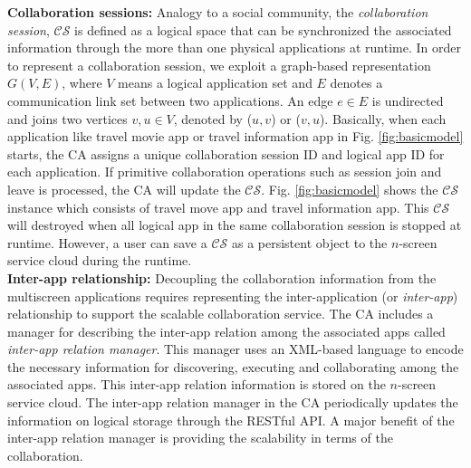 \documentclass{sig-alternate}
\begin{document}
\noindent
\textbf{Collaboration sessions: }
Analogy to a social community, the \textit{collaboration session}, $\mathcal{CS}$ is defined as a logical space  that can be synchronized the associated information through the more than one physical applications at runtime.
In order to represent a collaboration session, we exploit a graph-based representation $G(V, E)$, where $V$ means a logical application set and $E$ denotes a communication link set between two applications. An edge $e \in E$ is undirected and joins two vertices $v, u \in V$, denoted by ($u, v$) or ($v, u$). Basically, when each application like travel movie app or travel information app in Fig. \ref{fig:basicmodel} starts, the CA assigns a unique collaboration session ID and logical app ID for each application. If primitive collaboration operations such as session join and leave is processed, the CA will update the $\mathcal{CS}$. Fig. \ref{fig:basicmodel} shows the  $\mathcal{CS}$ instance which consists of travel move app and travel information app. This $\mathcal{CS}$ will destroyed when all logical app in the same collaboration session is stopped at runtime. However, a user can save a $\mathcal{CS}$ as a persistent object to the $n$-screen service cloud during the runtime.
\\

\noindent
\textbf{Inter-app relationship:}
Decoupling the collaboration information from the multiscreen applications requires representing the inter-application (or \textit{inter-app}) relationship to support the scalable collaboration service. The CA includes a manager for describing the inter-app relation among the associated apps called \textit{inter-app relation manager}. This manager uses an XML-based language to encode the necessary information for discovering, executing and collaborating among the associated apps.
This inter-app relation information is stored on the $n$-screen service cloud. The inter-app relation manager in the CA periodically updates the information on logical storage through the RESTful API.
A major benefit of the inter-app relation manager is providing the scalability in terms of the collaboration.
\end{document}
